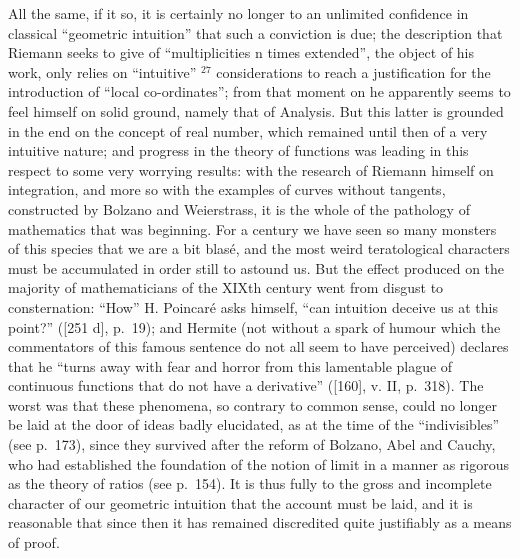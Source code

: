 All the same, if it so, it is certainly no longer to an unlimited confidence in classical ``geometric intuition'' that such a conviction is due; the description that Riemann seeks to give of ``multiplicities n times extended'', the object of his work, only relies on ``intuitive'' \(^{27}\) considerations to reach a justification for the introduction of ``local co-ordinates''; from that moment on he apparently seems to feel himself on solid ground, namely that of Analysis. But this latter is grounded in the end on the concept of real number, which remained until then of a very intuitive nature; and progress in the theory of functions was leading in this respect to some very worrying results: with the research of Riemann himself on integration, and more so with the examples of curves without tangents, constructed by Bolzano and Weierstrass, it is the whole of the pathology of mathematics that was beginning. For a century we have seen so many monsters of this species that we are a bit blasé, and the most weird teratological characters must be accumulated in order still to astound us. But the effect produced on the majority of mathematicians of the XIXth century went from disgust to consternation: ``How'' H. Poincaré asks himself, ``can intuition deceive us at this point?'' ({[}251 d{]}, p.~19); and Hermite (not without a spark of humour which the commentators of this famous sentence do not all seem to have perceived) declares that he ``turns away with fear and horror from this lamentable plague of continuous functions that do not have a derivative'' ({[}160{]}, v. II, p.~318). The worst was that these phenomena, so contrary to common sense, could no longer be laid at the door of ideas badly elucidated, as at the time of the ``indivisibles'' (see p.~173), since they survived after the reform of Bolzano, Abel and Cauchy, who had established the foundation of the notion of limit in a manner as rigorous as the theory of ratios (see p.~154). It is thus fully to the gross and incomplete character of our geometric intuition that the account must be laid, and it is reasonable that since then it has remained discredited quite justifiably as a means of proof.

